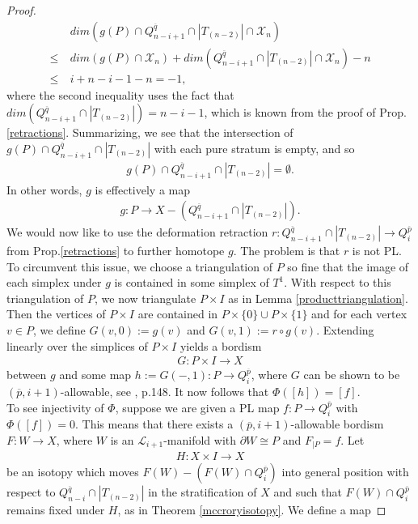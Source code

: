 \documentclass{scrreprt}
\begin{document}
\begin{proof}
\begin{align*}
&dim(g(P) \cap Q_{n-i+1}^{\overline{q}} \cap |T_{(n-2)}| \cap \mathcal{X}_{n}) \\ \leq \ &dim(g(P) \cap \mathcal{X}_{n}) + dim(Q_{n-i+1}^{\overline{q}} \cap |T_{(n-2)}| \cap \mathcal{X}_{n}) - n \\ \leq \ &i+n-i-1-n = -1,
\end{align*}
where the second inequality uses the fact that $dim(Q_{n-i+1}^{\overline{q}} \cap |T_{(n-2)}|) = n-i-1$, which is known from the proof of Prop.\ref{retractions}. Summarizing, we see that the intersection of $g(P) \cap Q_{n-i+1}^{\overline{q}} \cap |T_{(n-2)}|$ with each pure stratum is empty, and so
\begin{align*}
g(P) \cap Q_{n-i+1}^{\overline{q}} \cap |T_{(n-2)}| = \emptyset.
\end{align*}
In other words, $g$ is effectively a map 
\begin{align*}
g: P \to X-(Q_{n-i+1}^{\overline{q}} \cap |T_{(n-2)}|).
\end{align*}
We would now like to use the deformation retraction $r:  Q_{n-i+1}^{\overline{q}} \cap |T_{(n-2)}| \to Q_i^{\overline{p}}$ from Prop.\ref{retractions} to further homotope $g$. The problem is that $r$ is not PL. To circumvent this issue, we choose a triangulation of $P$ so fine that the image of each simplex under $g$ is contained in some simplex of $T^1$. With respect to this triangulation of $P$, we now triangulate $P \times I$ as in Lemma \ref{producttriangulation}. Then the vertices of $P \times I$ are contained in $P \times \{ 0 \} \cup P \times \{ 1 \}$ and for each vertex $v \in P$, we define $G(v,0):=g(v)$ and $G(v,1):= r \circ g (v)$. Extending linearly over the simplices of $P \times I$ yields a bordism 
\begin{align*}
G: P \times I \to X
\end{align*}
between $g$ and some map $h:=G(-,1):P \to Q_i^{\overline{p}}$, where $G$ can be shown to be $(\overline{p},i+1)$-allowable, see \cite{GM}, p.148. It now follows that 
$\Phi([h])=[f].$ \\
To see injectivity of $\Phi$, suppose we are given a PL map $f: P \to Q_i^{\overline{p}}$ with $\Phi([f])=0$. This means that there exists a $(\overline{p},i+1)$-allowable bordism $F:W \to X$, where $W$ is an $\mathcal{L}_{i+1}$-manifold with $\partial W \cong P$ and $F_{|P}=f$. Let
\begin{align*}
H: X \times I \to X
\end{align*}
be an isotopy which moves $F(W)-(F(W) \cap Q_i^{\overline{p}})$ into general position with respect to $Q_{n-i}^{\overline{q}} \cap |T_{(n-2)}|$ in the stratification of $X$ and such that $F(W) \cap Q_i^{\overline{p}}$ remains fixed under $H$, as in Theorem \ref{mccroryisotopy}. We define a map

\end{proof}
\end{document}

